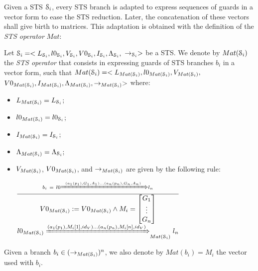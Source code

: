 Given a STS $\EuScript{S}_i$, every STS branch is adapted to
express sequences of guards in a vector form to ease the STS
reduction. Later, the concatenation of these vectors shall give
birth to matrices. This adaptation is obtained with the
definition of the \emph{STS operator} $Mat$:

\begin{definition}
\label{rule:matrix}
  Let $\EuScript{S}_i=<L_{\EuScript{S}_i},l0_{\EuScript{S}_i},V_{\EuScript{S}_i},V0_{\EuScript{S}_i},I_{\EuScript{S}_i},\Lambda_{\EuScript{S}_i},$
  $\rightarrow_{\EuScript{S}_i}>$ be a STS. We denote by
  $Mat(\EuScript{S}_i)$ the \emph{STS operator} that consists in
  expressing guards of STS branches $b_i$ in a vector form, such
  that
  $Mat(\EuScript{S}_i)=<L_{Mat(\EuScript{S}_i)},l0_{Mat(\EuScript{S}_i)},V_{Mat(\EuScript{S}_i)},$
  $V0_{Mat(\EuScript{S}_i)},I_{Mat(\EuScript{S}_i)},\Lambda_{Mat(\EuScript{S}_i)},\rightarrow_{Mat(\EuScript{S}_i)}>$
  where:

	\begin{itemize}
    \item $L_{Mat(\EuScript{S}_i)}=L_{\EuScript{S}_i}$;

    \item $l0_{Mat(\EuScript{S}_i)}=l0_{\EuScript{S}_i}$;

    \item $I_{Mat(\EuScript{S}_i)}=I_{\EuScript{S}_i}$;

    \item $\Lambda_{Mat(\EuScript{S}_i)} = \Lambda_{\EuScript{S}_i}$;

    \item $V_{Mat(\EuScript{S}_i)}$, $V0_{Mat(\EuScript{S}_i)}$,
      and $\rightarrow_{Mat(\EuScript{S}_i)}$ are given by the
      following rule:

    \begin{center}
    {\Large
    $\frac{b_i~= ~l0 \xRightarrow{(a_1(p_1),G_1,A_1) \dots
    (a_n(p_n),G_n,A_n)} l_n}{
      \begin{matrix}
        V0_{Mat(\EuScript{S}_i)}:=V0_{Mat(\EuScript{S}_i)} \wedge
        M_i=\begin{bmatrix}G_1\\ \vdots\\ G_n\end{bmatrix}\\
        l0_{Mat(\EuScript{S}_i)}
        \xRightarrow{(a_1(p_1),M_i[1],id_V) \dots (a_n(p_n),M_i[n],id_V) }_{Mat(\EuScript{S}_i)} l_n\\
      \end{matrix}
    }$
    }
    \end{center}
  \end{itemize}

  Given a branch $b_i \in (\rightarrow_{Mat(\EuScript{S}_i)})^n$,
  we also denote by $Mat(b_i) = M_i$ the vector used with $b_i$.
\end{definition}

